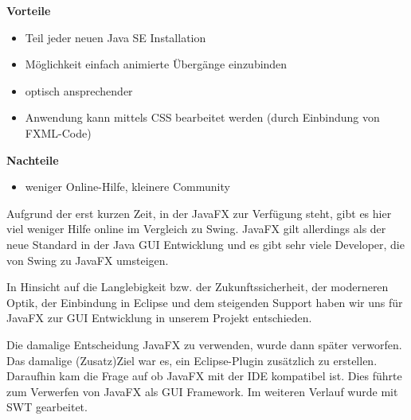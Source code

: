 \nsecend %


\textbf{Vorteile}
\begin{itemize}
	\item Teil jeder neuen Java SE Installation
	\item Möglichkeit einfach animierte Übergänge einzubinden
	\item optisch ansprechender
	\item Anwendung kann mittels CSS bearbeitet werden (durch Einbindung von FXML-Code)
\end{itemize}


\textbf{Nachteile}
\begin{itemize}
	\item weniger Online-Hilfe, kleinere Community
\end{itemize}


Aufgrund der erst kurzen Zeit, in der JavaFX zur Verfügung steht, gibt es hier viel weniger Hilfe online im Vergleich zu Swing. JavaFX gilt allerdings als der neue Standard in der Java GUI Entwicklung und es gibt sehr viele Developer, die von Swing zu JavaFX umsteigen.

\nsecend %

\nsecend %


In Hinsicht auf die Langlebigkeit bzw. der Zukunftssicherheit, der moderneren Optik, der Einbindung in Eclipse und dem steigenden Support haben wir uns für JavaFX zur GUI Entwicklung in unserem Projekt entschieden.

\nsecend %

Die damalige Entscheidung JavaFX zu verwenden, wurde dann später verworfen. Das damalige (Zusatz)Ziel war es, ein Eclipse-Plugin zusätzlich zu erstellen. Daraufhin kam die Frage auf ob JavaFX mit der IDE kompatibel ist. Dies führte zum Verwerfen von JavaFX als GUI Framework. Im weiteren Verlauf wurde mit SWT gearbeitet.
\nsecend %
\nsecend %